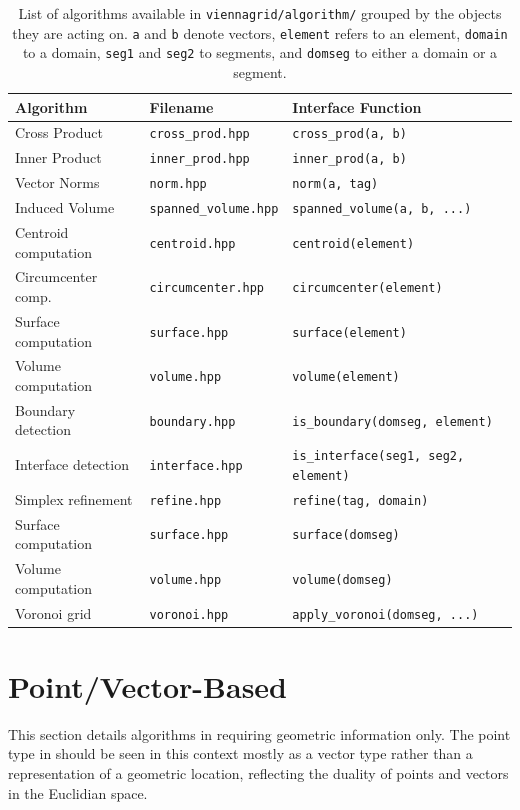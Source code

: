\begin{table}
 \begin{tabular}{|l|l|l|}
  \hline
   Algorithm & Filename   & Interface Function\\
   \hline
   Cross Product & \texttt{cross\_prod.hpp} & \lstinline|cross_prod(a, b)| \\
   Inner Product & \texttt{inner\_prod.hpp} & \lstinline|inner_prod(a, b)|\\
   Vector Norms & \texttt{norm.hpp} & \lstinline|norm(a, tag)| \\
   Induced Volume & \texttt{spanned\_volume.hpp} & \lstinline|spanned_volume(a, b, ...)| \\
   \hline
   Centroid computation & \texttt{centroid.hpp} & \lstinline|centroid(element)| \\
   Circumcenter comp. & \texttt{circumcenter.hpp} & \lstinline|circumcenter(element)| \\
   Surface computation & \texttt{surface.hpp} & \lstinline|surface(element)| \\
   Volume computation & \texttt{volume.hpp} & \lstinline|volume(element)| \\
   \hline
   Boundary detection & \texttt{boundary.hpp} & \lstinline|is_boundary(domseg, element)|\\
   Interface detection & \texttt{interface.hpp} & \lstinline|is_interface(seg1, seg2, element)|\\
   Simplex refinement & \texttt{refine.hpp} & \lstinline|refine(tag, domain)| \\
   Surface computation & \texttt{surface.hpp} & \lstinline|surface(domseg)| \\
   Volume computation & \texttt{volume.hpp} & \lstinline|volume(domseg)| \\
   Voronoi grid & \texttt{voronoi.hpp} & \lstinline|apply_voronoi(domseg, ...)| \\
   \hline
 \end{tabular}
 \caption{List of algorithms available in \texttt{viennagrid/algorithm/} grouped by the objects they are acting on. 
    \lstinline|a| and \lstinline|b| denote vectors, \lstinline|element| refers to an element,
    \lstinline|domain| to a domain, \lstinline|seg1| and \lstinline|seg2| to segments, and \lstinline|domseg| to either a domain or a segment.}
 \label{tab:algorithms}
\end{table}


\section{Point/Vector-Based}
This section details algorithms in {\ViennaGrid} requiring geometric information only.
The point type in {\ViennaGrid} should be seen in this context mostly as a vector type rather than a representation of a geometric location, reflecting the duality of points and vectors in the Euclidian space.

